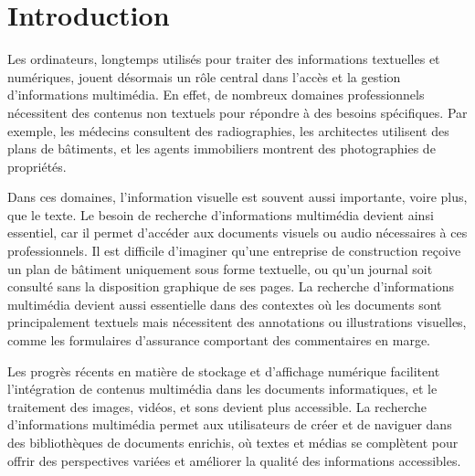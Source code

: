 \begin{section}


 \chapter*{Introduction}

 \par
 Les ordinateurs, longtemps utilisés pour traiter des informations textuelles et
 numériques, jouent désormais un rôle central dans l'accès et la gestion
 d’informations multimédia. En effet, de nombreux domaines professionnels
 nécessitent des contenus non textuels pour répondre à des besoins spécifiques.
 Par exemple, les médecins consultent des radiographies, les architectes
 utilisent des plans de bâtiments, et les agents immobiliers montrent des
 photographies de propriétés.
 \par
 Dans ces domaines, l’information visuelle est souvent aussi importante, voire
 plus, que le texte. Le besoin de recherche d’informations multimédia devient
 ainsi essentiel, car il permet d’accéder aux documents visuels ou audio
 nécessaires à ces professionnels. Il est difficile d’imaginer qu'une entreprise
 de construction reçoive un plan de bâtiment uniquement sous forme textuelle, ou
 qu’un journal soit consulté sans la disposition graphique de ses pages. La
 recherche d’informations multimédia devient aussi essentielle dans des
 contextes où les documents sont principalement textuels mais nécessitent des
 annotations ou illustrations visuelles, comme les formulaires d’assurance
 comportant des commentaires en marge.
 \par
 Les progrès récents en matière de stockage et d’affichage numérique facilitent
 l’intégration de contenus multimédia dans les documents informatiques, et le
 traitement des images, vidéos, et sons devient plus accessible. La recherche
 d’informations multimédia permet aux utilisateurs de créer et de naviguer dans
 des bibliothèques de documents enrichis, où textes et médias se complètent pour
 offrir des perspectives variées et améliorer la qualité des informations
 accessibles.

 \vfill

\end{section}
